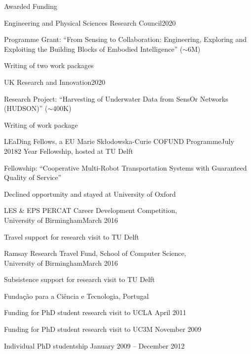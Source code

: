 
\begin{rSection}{Awarded Funding}

\begin{rSubsection}{Engineering and Physical Sciences Research Council}{2020}{}{}
\item Programme Grant: ``From Sensing to Collaboration: Engineering, Exploring and Exploiting the Building Blocks of Embodied Intelligence'' ($\sim$\textsterling 6M)
\item Writing of two work packages
\end{rSubsection}

\begin{rSubsection}{UK Research and Innovation}{2020}{}{}
\item Research Project: ``Harvesting of Underwater Data from SensOr Networks (HUDSON)'' ($\sim$\textsterling 400K)
\item Writing of work package
\end{rSubsection}

\begin{rSubsection}{ LEaDing Fellows, a  EU Marie Skłodowska-Curie COFUND Programme}{July 2018}{2 Year Fellowship, hosted at TU Delft }{}
\item Fellowship: ``Cooperative Multi-Robot Transportation Systems with Guaranteed Quality of Service''
\item Declined opportunity and stayed at University of Oxford
\end{rSubsection}

\begin{rSubsection}{ LES \& EPS PERCAT Career Development Competition,\\ University of Birmingham}{March 2016}{}{}
\item Travel support for research visit to TU Delft
\end{rSubsection}

\begin{rSubsection}{ Ramsay Research Travel Fund, School of Computer Science, \\ University of Birmingham}{March 2016}{}{}
\item Subsistence support for research visit to TU Delft 
\end{rSubsection} 

\begin{rSubsection}{ Funda\c{c}\~{a}o para a Ci\^{e}ncia e Tecnologia, Portugal}{}{}{}
\item Funding for PhD student research visit to UCLA \hfill April 2011

\item Funding for PhD student research visit to UC3M \hfill November 2009

\item Individual PhD studentship  \hfill  January 2009 -- December 2012

\end{rSubsection}

\end{rSection}
